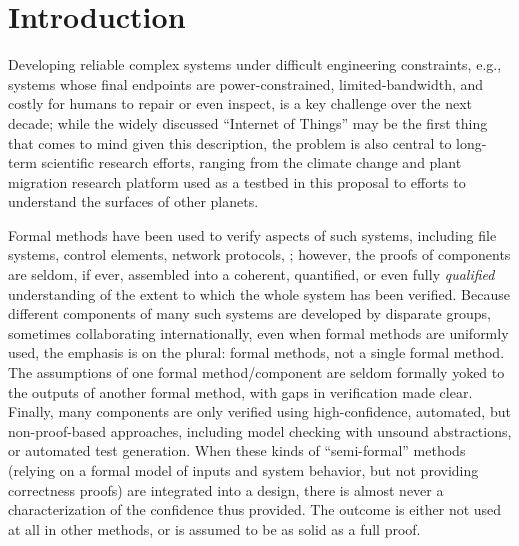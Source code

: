 
\section{Introduction}

Developing reliable complex systems under difficult engineering
constraints, e.g., systems whose final endpoints are
power-constrained, limited-bandwidth, and costly for humans to
repair or even inspect, is a key challenge over the next decade; while the
widely discussed ``Internet of Things'' may be the first thing that
comes to mind given this description, the problem is also central to long-term
scientific research efforts, ranging from the climate change and
plant migration research platform used as a testbed in this proposal to
efforts to understand the surfaces of other planets.

Formal methods have been used to verify aspects of such systems,
including file systems, control elements, network protocols,
; however, the proofs
of components are seldom, if ever, assembled into a coherent,
quantified, or even fully \emph{qualified} understanding of the extent to which the
whole system has been verified.  Because different components of many
such systems are developed by disparate groups, sometimes
collaborating internationally, even when formal methods are uniformly
used, the emphasis is on the plural:  formal methods, not a single
formal method.  The assumptions of one formal method/component are
seldom formally yoked to the outputs of another formal method, with
gaps in verification made clear.   Finally, many components are only
verified using high-confidence, automated, but non-proof-based
approaches, including model checking with unsound abstractions, or
automated test generation.  When these kinds of
``semi-formal'' methods (relying on a formal model of inputs and
system behavior, but not providing correctness proofs) are integrated
into a design, there is almost never a characterization of the
confidence thus provided.  The outcome is either not used at all in
other methods, or is assumed to be as solid as a full proof.

